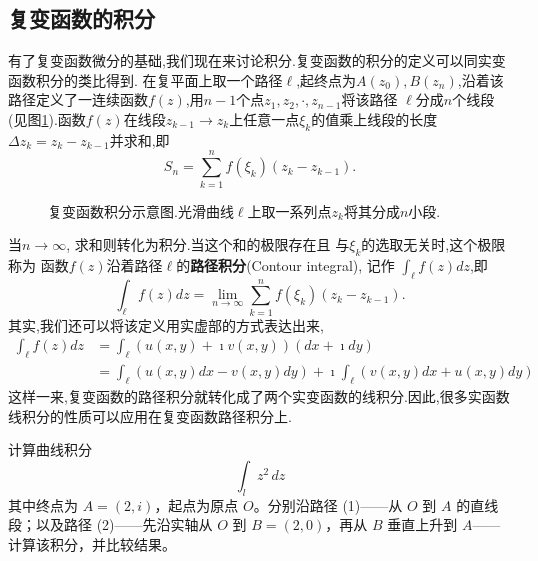 \subsection[定义和性质]{复变函数的积分}
有了复变函数微分的基础,我们现在来讨论积分.复变函数的积分的定义可以同实变函数积分的类比得到.
在复平面上取一个路径$\ell$,起终点为$A(z_0),B(z_n)$,沿着该路径定义了一连续函数$f(z)$,用$n-1$个点$z_1, z_2,\cdot, z_{n-1}$将该路径
$\ell$分成$n$个线段(见图\ref{fig:complex_integral}).函数$f(z)$在线段$z_{k-1}\rightarrow z_{k}$上任意一点$\xi_k$的值乘上线段的长度$\Delta z_k = z_k - z_{k-1}$并求和,即
\begin{equation}
    S_n = \sum_{k=1}^{n} f(\xi_k) (z_{k} - z_{k-1}) .
\end{equation}
\begin{figure}[htbp]
    \centering
    
    \caption{复变函数积分示意图.光滑曲线$\ell$上取一系列点$z_k$将其分成$n$小段.}
    \label{fig:complex_integral}
\end{figure}
当$n\to \infty$, 求和则转化为积分.当这个和的极限存在且
与$\xi_k$的选取无关时,这个极限称为
函数$f(z)$沿着路径$\ell$的\textbf{路径积分}(Contour integral), 记作
$\int_{\ell} f(z) dz$,即
\begin{equation}
    \int_{\ell} f(z) dz = \lim_{n\to \infty} \sum_{k=1}^{n} f(\xi_k) (z_{k} - z_{k-1}) . 
\end{equation}
其实,我们还可以将该定义用实虚部的方式表达出来,
\begin{align}
    \int_{\ell} f(z) dz  & = \int_{\ell} \left( u(x,y) + \imath v(x,y) \right) (dx + \imath dy) 
    \\
    & = \int_{\ell} \left( u(x,y) dx  -  v(x,y) dy \right) + \imath \int_{\ell}  \left( v(x,y) dx  + u(x,y)dy \right) 
\end{align}
这样一来,复变函数的路径积分就转化成了两个实变函数的线积分.因此,很多实函数线积分的性质可以应用在复变函数路径积分上.

\begin{example}
计算曲线积分
\[
\int_{l} z^{2}\,dz
\]
其中终点为 \(A=(2,i)\)，起点为原点 \(O\)。分别沿路径 (1)——从 \(O\) 到 \(A\) 的直线段；以及路径 (2)——先沿实轴从 \(O\) 到 \(B=(2,0)\)，再从 \(B\) 垂直上升到 \(A\)——计算该积分，并比较结果。
\end{example}
\begin{center}
\end{center}

